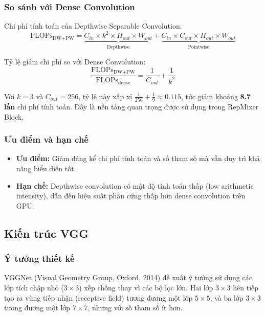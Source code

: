 \subsubsection*{So sánh với Dense Convolution}

Chi phí tính toán của Depthwise Separable Convolution:
\begin{equation}
    \text{FLOPs}_{\text{DW+PW}} = \underbrace{C_{in} \times k^2 \times H_{out} \times W_{out}}_{\text{Depthwise}} + \underbrace{C_{in} \times C_{out} \times H_{out} \times W_{out}}_{\text{Pointwise}}
\end{equation}

Tỷ lệ giảm chi phí so với Dense Convolution:
\begin{equation}
    \frac{\text{FLOPs}_{\text{DW+PW}}}{\text{FLOPs}_{\text{dense}}} = \frac{1}{C_{out}} + \frac{1}{k^2}
\end{equation}

Với $k = 3$ và $C_{out} = 256$, tỷ lệ này xấp xỉ $\frac{1}{256} + \frac{1}{9} \approx 0.115$, tức giảm khoảng \textbf{8.7 lần} chi phí tính toán. Đây là nền tảng quan trọng được \fastvit{} sử dụng trong RepMixer Block.

\subsubsection*{Ưu điểm và hạn chế}
\begin{itemize}
    \item \textbf{Ưu điểm:} Giảm đáng kể chi phí tính toán và số tham số mà vẫn duy trì khả năng biểu diễn tốt.
    \item \textbf{Hạn chế:} Depthwise convolution có mật độ tính toán thấp (low arithmetic intensity), dẫn đến hiệu suất phần cứng thấp hơn dense convolution trên GPU.
\end{itemize}

\subsection{Kiến trúc VGG}
\label{subsec:vgg}

\subsubsection*{Ý tưởng thiết kế}

VGGNet \cite{vgg2015} (Visual Geometry Group, Oxford, 2014) đề xuất ý tưởng sử dụng các lớp tích chập nhỏ ($3 \times 3$) xếp chồng thay vì các bộ lọc lớn. Hai lớp $3 \times 3$ liên tiếp tạo ra vùng tiếp nhận (receptive field) tương đương một lớp $5 \times 5$, và ba lớp $3 \times 3$ tương đương một lớp $7 \times 7$, nhưng với số tham số ít hơn.


